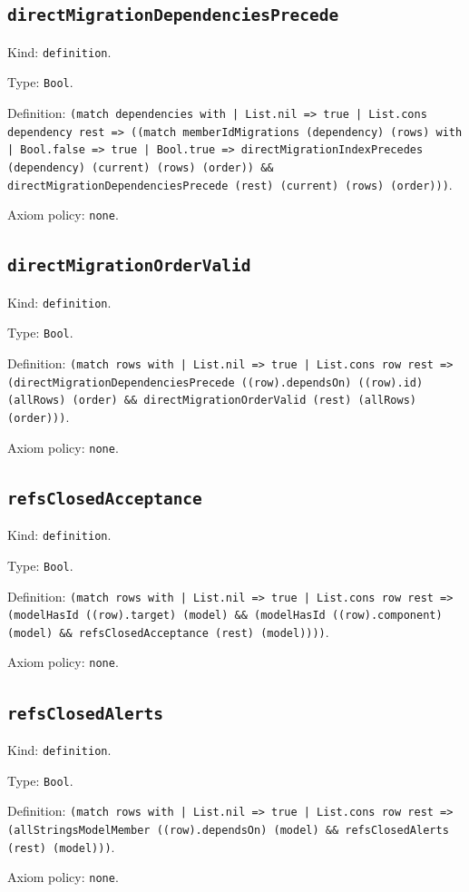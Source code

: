 \documentclass[11pt]{article}
\begin{document}
\subsection*{\texttt{directMigrationDependenciesPrecede}}
\noindent Kind: \texttt{definition}.\par
\noindent Type: \texttt{Bool}.\par
\noindent Definition: \texttt{(match dependencies with | List.nil => true | List.cons dependency rest => ((match memberIdMigrations (dependency) (rows) with | Bool.false => true | Bool.true => directMigrationIndexPrecedes (dependency) (current) (rows) (order)) \&\& directMigrationDependenciesPrecede (rest) (current) (rows) (order)))}.\par
\noindent Axiom policy: \texttt{none}.\par
\subsection*{\texttt{directMigrationOrderValid}}
\noindent Kind: \texttt{definition}.\par
\noindent Type: \texttt{Bool}.\par
\noindent Definition: \texttt{(match rows with | List.nil => true | List.cons row rest => (directMigrationDependenciesPrecede ((row).dependsOn) ((row).id) (allRows) (order) \&\& directMigrationOrderValid (rest) (allRows) (order)))}.\par
\noindent Axiom policy: \texttt{none}.\par
\subsection*{\texttt{refsClosedAcceptance}}
\noindent Kind: \texttt{definition}.\par
\noindent Type: \texttt{Bool}.\par
\noindent Definition: \texttt{(match rows with | List.nil => true | List.cons row rest => (modelHasId ((row).target) (model) \&\& (modelHasId ((row).component) (model) \&\& refsClosedAcceptance (rest) (model))))}.\par
\noindent Axiom policy: \texttt{none}.\par
\subsection*{\texttt{refsClosedAlerts}}
\noindent Kind: \texttt{definition}.\par
\noindent Type: \texttt{Bool}.\par
\noindent Definition: \texttt{(match rows with | List.nil => true | List.cons row rest => (allStringsModelMember ((row).dependsOn) (model) \&\& refsClosedAlerts (rest) (model)))}.\par
\noindent Axiom policy: \texttt{none}.\par
\end{document}
